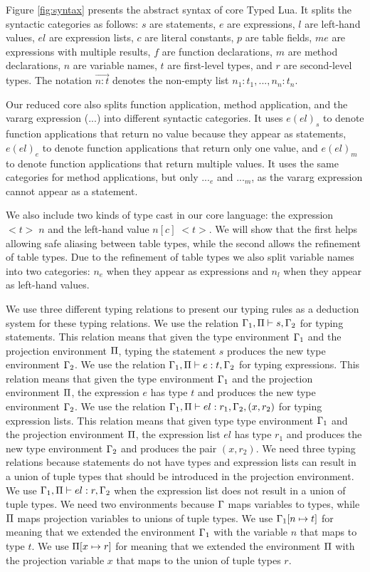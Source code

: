 Figure \ref{fig:syntax} presents the abstract syntax of core Typed Lua.
It splits the syntactic categories as follows:
$s$ are statements, $e$ are expressions, $l$ are left-hand values,
$el$ are expression lists, $c$ are literal constants, $p$ are table fields,
$me$ are expressions with multiple results, $f$ are function declarations,
$m$ are method declarations, $n$ are variable names,
$t$ are first-level types, and $r$ are second-level types.
The notation $\vec{n{:}t}$ denotes the non-empty list
$n_{1}{:}t_{1}, ..., n_{n}{:}t_{n}$.

Our reduced core also splits function application, method application, and
the vararg expression (${...}$) into different syntactic categories.
It uses $e(el)_{s}$ to denote function applications that return no value
because they appear as statements,
$e(el)_{e}$ to denote function applications that return only one value,
and $e(el)_{m}$ to denote function applications that return multiple values.
It uses the same categories for method applications, but only ${...}_{e}$
and ${...}_{m}$, as the vararg expression cannot appear as a statement.

We also include two kinds of type cast in our core language:
the expression ${<}t{>} \;n$ and the left-hand value $n[c] \; {<}t{>}$.
We will show that the first helps allowing safe aliasing between
table types, while the second allows the refinement of table types.
Due to the refinement of table types we also split variable names
into two categories: $n_{e}$ when they appear as expressions and
$n_{l}$ when they appear as left-hand values.

We use three different typing relations to present our typing rules
as a deduction system for these typing relations.
We use the relation $\Gamma_{1}, \Pi \vdash s, \Gamma_{2}$ for typing
statements.
This relation means that given the type environment $\Gamma_{1}$
and the projection environment $\Pi$,
typing the statement $s$ produces the new type environment $\Gamma_{2}$.
We use the relation $\Gamma_{1}, \Pi \vdash e : t, \Gamma_{2}$ for
typing expressions.
This relation means that given the type environment $\Gamma_{1}$
and the projection environment $\Pi$,
the expression $e$ has type $t$ and produces the new type environment $\Gamma_{2}$.
We use the relation $\Gamma_{1}, \Pi \vdash el : r_{1}, \Gamma_{2}, (x,r_{2})$
for typing expression lists.
This relation means that given type type environment $\Gamma_{1}$
and the projection environment $\Pi$,
the expression list $el$ has type $r_{1}$ and produces the new type
environment $\Gamma_{2}$ and produces the pair $(x,r_{2})$.
We need three typing relations because statements do not have types
and expression lists can result in a union of tuple types that
should be introduced in the projection environment.
We use $\Gamma_{1}, \Pi \vdash el : r, \Gamma_{2}$ when the expression
list does not result in a union of tuple types.
We need two environments because $\Gamma$ maps variables to types,
while $\Pi$ maps projection variables to unions of tuple types.
We use $\Gamma_{1}[n \mapsto t]$ for meaning that we extended the environment
$\Gamma_{1}$ with the variable $n$ that maps to type $t$.
We use $\Pi[x \mapsto r]$ for meaning that we extended the environment
$\Pi$ with the projection variable $x$ that maps to the union of tuple types $r$.

